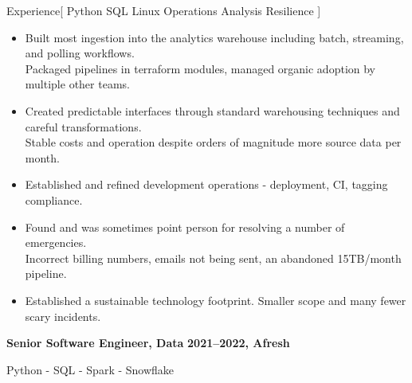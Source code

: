 \documentclass[11pt,a4paper]{article}
\begin{document}
\begin{mysection}{Experience}[
    Python
    \textbullet{} SQL
    \textbullet{} Linux
    \textbullet{} Operations
    \textbullet{} Analysis
    \textbullet{} Resilience
]
\begin{addmargin}[0.5em]{0em}
\begin{adjustwidth}{1ex}{0ex}
      \begin{itemize}
          [label=-, topsep=0pt, itemsep=0.5ex, parsep=0pt, leftmargin=1em]

      \item Built most ingestion into the analytics warehouse including batch,
            streaming, and polling workflows.
      \\    Packaged pipelines in terraform modules, managed organic adoption
            by multiple other teams.

      \item Created predictable interfaces through standard warehousing 
            techniques and careful transformations.
      \\    Stable costs and operation despite orders of magnitude more
            source data per month.

      \item Established and refined development operations - deployment, CI,
            tagging compliance.

      \item Found and was sometimes point person for resolving a number of
            emergencies.
      \\    Incorrect billing numbers, emails not being sent,
            an abandoned 15TB/month pipeline.
      \item Established a sustainable technology footprint.  Smaller scope and many fewer scary incidents.

      \end{itemize}

    \end{adjustwidth}
  \end{addmargin}
  \medskip


  \begin{addmargin}[0.5em]{0em}
    {\large\bfseries Senior Software Engineer, Data}%
    \hfill {\bfseries 2021--2022, Afresh}%
    \begin{adjustwidth}{1ex}{0ex}
      Python - SQL - Spark - Snowflake


\end{adjustwidth}
\end{addmargin}
\end{mysection}
\end{document}
